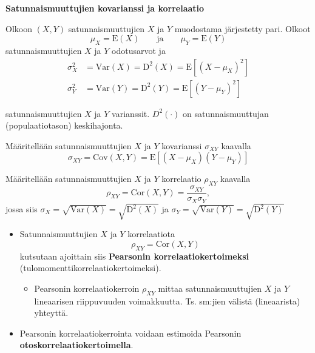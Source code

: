 \documentclass[
]{book}
\providecommand{\tightlist}{%
  \setlength{\itemsep}{0pt}\setlength{\parskip}{0pt}}
\begin{document}
\begin{defblock}{}
\textbf{Satunnaismuuttujien kovarianssi ja korrelaatio}

Olkoon \((X, Y)\) satunnaismuuttujien \(X\) ja \(Y\) muodostama järjestetty pari. Olkoot
\[
\mu_X = \text{E}(X) \qquad \mathrm{ja} \qquad  \mu_Y = \text{E}(Y)
\]
satunnaismuuttujien \(X\) ja \(Y\) odotusarvot ja
\begin{align*}
\sigma^2_X &= \mathrm{Var}(X) = \text{D}^2(X) = \text{E}[(X - \mu_X)^2] \\
\sigma^2_Y &= \mathrm{Var}(Y) = \text{D}^2(Y) = \text{E}[(Y - \mu_Y)^2]
\end{align*}

satunnaismuuttujien \(X\) ja \(Y\) varianssit. \(D^2(\cdot)\) on satunnaismuuttujan (populaatiotason) keskihajonta.

\hfill\break

Määritellään satunnaismuuttujien \(X\) ja \(Y\) kovarianssi \(\sigma_{XY}\) kaavalla
\[
\sigma_{XY} = \mathrm{Cov}(X,Y) = \text{E}[(X-\mu_X)(Y-\mu_Y)]
\]

Määritellään satunnaismuuttujien \(X\) ja \(Y\) korrelaatio \(\rho_{XY}\) kaavalla
\[
\rho_{XY} = \mathrm{Cor}(X,Y) = \frac{\sigma_{XY}}{\sigma_{X} \sigma_{Y}},
\]
jossa siis \(\sigma_X = \sqrt{\mathrm{Var}(X)} = \sqrt{\text{D}^2(X)}\) ja \(\sigma_Y = \sqrt{\mathrm{Var}(Y)} = \sqrt{\text{D}^2(Y)}\)

\end{defblock}

\begin{itemize}
\tightlist
\item
  Satunnaismuuttujien \(X\) ja \(Y\) korrelaatiota
  \[
  \rho_{XY} = \mathrm{Cor}(X, Y)
  \]
  kutsutaan ajoittain siis \textbf{Pearsonin korrelaatiokertoimeksi} (tulomomenttikorrelaatiokertoimeksi).

  \begin{itemize}
  \tightlist
  \item
    Pearsonin korrelaatiokerroin \(\rho_{XY}\) mittaa satunnaismuuttujien \(X\) ja \(Y\) lineaarisen riippuvuuden voimakkuutta. Ts. sm:jien välistä (lineaarista) yhteyttä.
  \end{itemize}
\item
  Pearsonin korrelaatiokerrointa voidaan estimoida Pearsonin \textbf{otoskorrelaatiokertoimella}.
\end{itemize}
\end{document}

